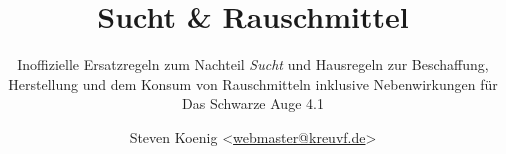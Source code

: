 

\title{Sucht \& Rauschmittel}
\subtitle{Inoffizielle Ersatzregeln zum Nachteil \emph{Sucht} und Hausregeln zur Beschaffung, Herstellung und dem Konsum von Rauschmitteln inklusive Nebenwirkungen für Das Schwarze Auge 4.1}
\author{Steven Koenig <\href{mailto:webmaster@kreuvf.de}{webmaster@kreuvf.de}>}
\date{\gitAuthorDate{}}
\maketitle
